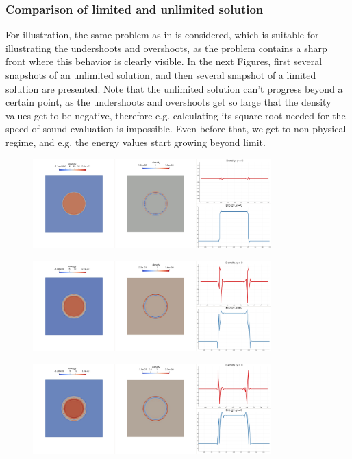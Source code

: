 \subsubsection{Comparison of limited and unlimited solution}
For illustration, the same problem as in  is considered, which is suitable for illustrating the undershoots and overshoots, as the problem contains a sharp front where this behavior is clearly visible.
In the next Figures, first several snapshots of an unlimited solution, and then several snapshot of a limited solution are presented. Note that the unlimited solution can't progress beyond a certain point, as the undershoots and overshoots get so large that the density values get to be negative, therefore e.g. calculating its square root needed for the speed of sound evaluation is impossible. Even before that, we get to non-physical regime, and e.g. the energy values start growing beyond limit.
\begin{figure}[H]
		\begin{center}
			\includegraphics[width=0.82\textwidth]{img/limit/nl1.jpg}
		\end{center}
	\end{figure}\vspace{-12mm}
	\begin{figure}[H]
		\begin{center}
			\includegraphics[width=0.82\textwidth]{img/limit/nl2.jpg}
		\end{center}
	\end{figure}\vspace{-12mm}
	\begin{figure}[H]
		\begin{center}
			\includegraphics[width=0.82\textwidth]{img/limit/nl3.jpg}
		\end{center}
	\end{figure}\vspace{-12mm}
